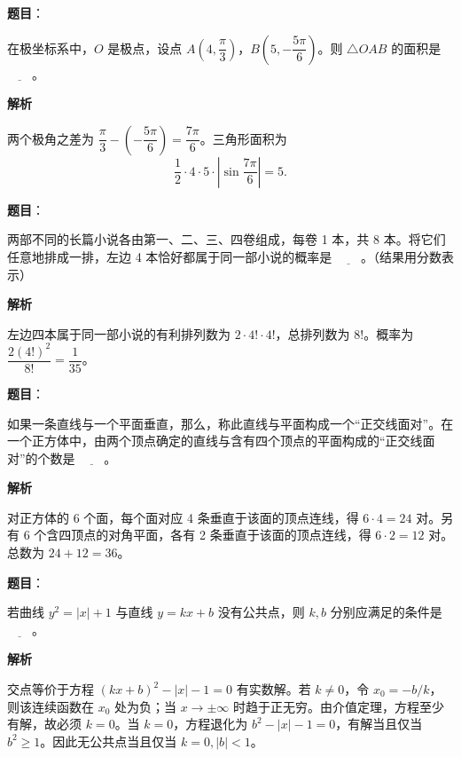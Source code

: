 \begin{answer}

\textbf{题目}：

在极坐标系中，$O$ 是极点，设点 $A\left(4,\dfrac\pi3\right)$，$B\left(5,-\dfrac{5\pi}6\right)$。则 $\triangle OAB$ 的面积是 $\underline{\qquad}$。

\textbf{解析}

两个极角之差为 $\dfrac\pi3-\left(-\dfrac{5\pi}6\right)=\dfrac{7\pi}6$。三角形面积为
\nopagebreak[4]
\[
\frac12\cdot4\cdot5\cdot\left|\sin\frac{7\pi}6\right|=5.
\]


\end{answer}
\begin{answer}

\textbf{题目}：

两部不同的长篇小说各由第一、二、三、四卷组成，每卷 1 本，共 8 本。将它们任意地排成一排，左边 4 本恰好都属于同一部小说的概率是 $\underline{\qquad}$。（结果用分数表示）

\textbf{解析}

左边四本属于同一部小说的有利排列数为 $2\cdot4!\cdot4!$，总排列数为 $8!$。概率为 $\dfrac{2(4!)^2}{8!}=\dfrac1{35}$。


\end{answer}
\begin{answer}

\textbf{题目}：

如果一条直线与一个平面垂直，那么，称此直线与平面构成一个“正交线面对”。在一个正方体中，由两个顶点确定的直线与含有四个顶点的平面构成的“正交线面对”的个数是 $\underline{\qquad}$。

\textbf{解析}

对正方体的 6 个面，每个面对应 4 条垂直于该面的顶点连线，得 $6\cdot4=24$ 对。另有 6 个含四顶点的对角平面，各有 2 条垂直于该面的顶点连线，得 $6\cdot2=12$ 对。总数为 $24+12=36$。


\end{answer}
\begin{answer}

\textbf{题目}：

若曲线 $y^2=|x|+1$ 与直线 $y=kx+b$ 没有公共点，则 $k,b$ 分别应满足的条件是 $\underline{\qquad}$。

\textbf{解析}

交点等价于方程 $(kx+b)^2-|x|-1=0$ 有实数解。若 $k\ne0$，令 $x_0=-b/k$，则该连续函数在 $x_0$ 处为负；当 $x\to\pm\infty$ 时趋于正无穷。由介值定理，方程至少有解，故必须 $k=0$。当 $k=0$，方程退化为 $b^2-|x|-1=0$，有解当且仅当 $b^2\ge1$。因此无公共点当且仅当 $k=0,|b|<1$。


\end{answer}
